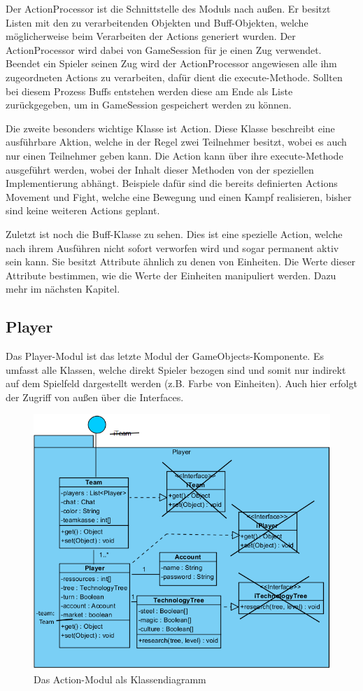 \documentclass[fontsize=12pt,paper=a4,twoside]{scrartcl}
\begin{document}
Der ActionProcessor ist die Schnittstelle des Moduls nach außen. Er besitzt Listen mit den zu verarbeitenden Objekten und Buff-Objekten, welche möglicherweise beim Verarbeiten der Actions generiert wurden. Der ActionProcessor wird dabei von GameSession für je einen Zug verwendet. Beendet ein Spieler seinen Zug wird der ActionProcessor angewiesen alle ihm zugeordneten Actions zu verarbeiten, dafür dient die execute-Methode. Sollten bei diesem Prozess Buffs entstehen werden diese am Ende als Liste zurückgegeben, um in GameSession gespeichert werden zu können.

Die zweite besonders wichtige Klasse ist Action. Diese Klasse beschreibt eine ausführbare Aktion, welche in der Regel zwei Teilnehmer besitzt, wobei es auch nur einen Teilnehmer geben kann. Die Action kann über ihre execute-Methode ausgeführt werden, wobei der Inhalt dieser Methoden von der speziellen Implementierung abhängt. Beispiele dafür sind die bereits definierten Actions Movement und Fight, welche eine Bewegung und einen Kampf realisieren, bisher sind keine weiteren Actions geplant.

Zuletzt ist noch die Buff-Klasse zu sehen. Dies ist eine spezielle Action, welche nach ihrem Ausführen nicht sofort verworfen wird und sogar permanent aktiv sein kann. Sie besitzt Attribute ähnlich zu denen von Einheiten. Die Werte dieser Attribute bestimmen, wie die Werte der Einheiten manipuliert werden. Dazu mehr im nächsten Kapitel. 

\subsection{Player}
Das Player-Modul ist das letzte Modul der GameObjects-Komponente. Es umfasst alle Klassen, welche direkt Spieler bezogen sind und somit nur indirekt auf dem Spielfeld dargestellt werden (z.B. Farbe von Einheiten). Auch hier erfolgt der Zugriff von außen über die Interfaces.

\begin{figure}[h]
\centering
\includegraphics[width=1.0\linewidth]{PlayerClass}
\caption{Das Action-Modul als Klassendiagramm}
\label{fig:PlayerClass}
\end{figure}
\end{document}
